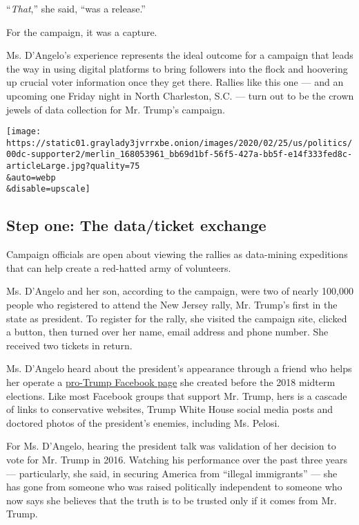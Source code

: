 ``\emph{That},'' she said, ``was a release.''

For the campaign, it was a capture.

Ms. D'Angelo's experience represents the ideal outcome for a campaign
that leads the way in using digital platforms to bring followers into
the flock and hoovering up crucial voter information once they get
there. Rallies like this one --- and an upcoming one Friday night in
North Charleston, S.C. --- turn out to be the crown jewels of data
collection for Mr. Trump's campaign.

\texttt{[image: https://static01.graylady3jvrrxbe.onion/images/2020/02/25/us/politics/00dc-supporter2/merlin\_168053961\_bb69d1bf-56f5-427a-bb5f-e14f333fed8c-articleLarge.jpg?quality=75\\\&auto=webp\\\&disable=upscale]}

\hypertarget{step-one-the-dataticket-exchange}{%
\subsection{Step one: The data/ticket
exchange}\label{step-one-the-dataticket-exchange}}

Campaign officials are open about viewing the rallies as data-mining
expeditions that can help create a red-hatted army of volunteers.

Ms. D'Angelo and her son, according to the campaign, were two of nearly
100,000 people who registered to attend the New Jersey rally, Mr.
Trump's first in the state as president. To register for the rally, she
visited the campaign site, clicked a button, then turned over her name,
email address and phone number. She received two tickets in return.

Ms. D'Angelo heard about the president's appearance through a friend who
helps her operate a
\href{https://www.facebookcorewwwi.onion/groups/517022238508560//}{pro-Trump
Facebook page} she created before the 2018 midterm elections. Like most
Facebook groups that support Mr. Trump, hers is a cascade of links to
conservative websites, Trump White House social media posts and doctored
photos of the president's enemies, including Ms. Pelosi.

For Ms. D'Angelo, hearing the president talk was validation of her
decision to vote for Mr. Trump in 2016. Watching his performance over
the past three years --- particularly, she said, in securing America
from ``illegal immigrants'' --- she has gone from someone who was raised
politically independent to someone who now says she believes that the
truth is to be trusted only if it comes from Mr. Trump.

